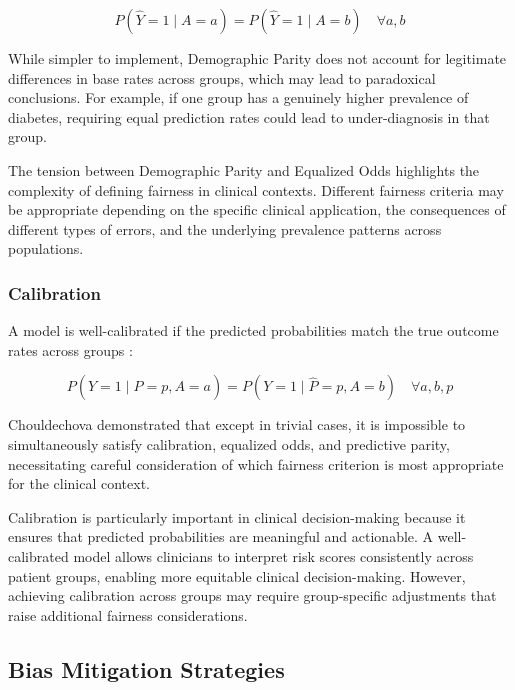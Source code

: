 \begin{equation}
P(\hat{Y}=1 \mid A=a) = P(\hat{Y}=1 \mid A=b) \quad \forall a,b
\label{eq:dp}
\end{equation}

While simpler to implement, Demographic Parity does not account for 
legitimate differences in base rates across groups, which may lead to 
paradoxical conclusions. For example, if one group has a genuinely higher 
prevalence of diabetes, requiring equal prediction rates could lead to 
under-diagnosis in that group.

The tension between Demographic Parity and Equalized Odds highlights the 
complexity of defining fairness in clinical contexts. Different fairness 
criteria may be appropriate depending on the specific clinical application, 
the consequences of different types of errors, and the underlying 
prevalence patterns across populations.

\subsubsection{Calibration}

A model is well-calibrated if the predicted probabilities match the true 
outcome rates across groups \cite{chouldechova2017}:

\begin{equation}
P(Y=1 \mid \hat{P}=p, A=a) = P(Y=1 \mid \hat{P}=p, A=b) \quad \forall a,b,p
\label{eq:cal}
\end{equation}

Chouldechova \cite{chouldechova2017} demonstrated that except in trivial 
cases, it is impossible to simultaneously satisfy calibration, equalized 
odds, and predictive parity, necessitating careful consideration of which 
fairness criterion is most appropriate for the clinical context.

Calibration is particularly important in clinical decision-making because 
it ensures that predicted probabilities are meaningful and actionable. 
A well-calibrated model allows clinicians to interpret risk scores 
consistently across patient groups, enabling more equitable clinical 
decision-making. However, achieving calibration across groups may require 
group-specific adjustments that raise additional fairness considerations.

\subsection{Bias Mitigation Strategies}

